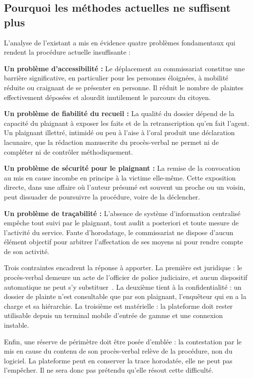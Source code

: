 \subsection{Pourquoi les méthodes actuelles ne suffisent plus}

L'analyse de l'existant a mis en évidence quatre problèmes fondamentaux qui rendent la procédure actuelle insuffisante :

\textbf{Un problème d'accessibilité :} Le déplacement au commissariat constitue une barrière significative, en particulier pour les personnes éloignées, à mobilité réduite ou craignant de se présenter en personne. Il réduit le nombre de plaintes effectivement déposées et alourdit inutilement le parcours du citoyen.

\textbf{Un problème de fiabilité du recueil :} La qualité du dossier dépend de la capacité du plaignant à exposer les faits et de la retranscription qu'en fait l'agent. Un plaignant illettré, intimidé ou peu à l'aise à l'oral produit une déclaration lacunaire, que la rédaction manuscrite du procès-verbal ne permet ni de compléter ni de contrôler méthodiquement.

\textbf{Un problème de sécurité pour le plaignant :} La remise de la convocation au mis en cause incombe en principe à la victime elle-même. Cette exposition directe, dans une affaire où l'auteur présumé est souvent un proche ou un voisin, peut dissuader de poursuivre la procédure, voire de la déclencher.

\textbf{Un problème de traçabilité :} L'absence de système d'information centralisé empêche tout suivi par le plaignant, tout audit a posteriori et toute mesure de l'activité du service. Faute d'horodatage, le commissariat ne dispose d'aucun élément objectif pour arbitrer l'affectation de ses moyens ni pour rendre compte de son activité.

Trois contraintes encadrent la réponse à apporter. La première est juridique : le procès-verbal demeure un acte de l'officier de police judiciaire, et aucun dispositif automatique ne peut s'y substituer~\cite{cameroun-cpp}. La deuxième tient à la confidentialité : un dossier de plainte n'est consultable que par son plaignant, l'enquêteur qui en a la charge et sa hiérarchie. La troisième est matérielle : la plateforme doit rester utilisable depuis un terminal mobile d'entrée de gamme et une connexion instable.

Enfin, une réserve de périmètre doit être posée d'emblée : la contestation par le mis en cause du contenu de son procès-verbal relève de la procédure, non du logiciel. La plateforme peut en conserver la trace horodatée, elle ne peut pas l'empêcher. Il ne sera donc pas prétendu qu'elle résout cette difficulté.
